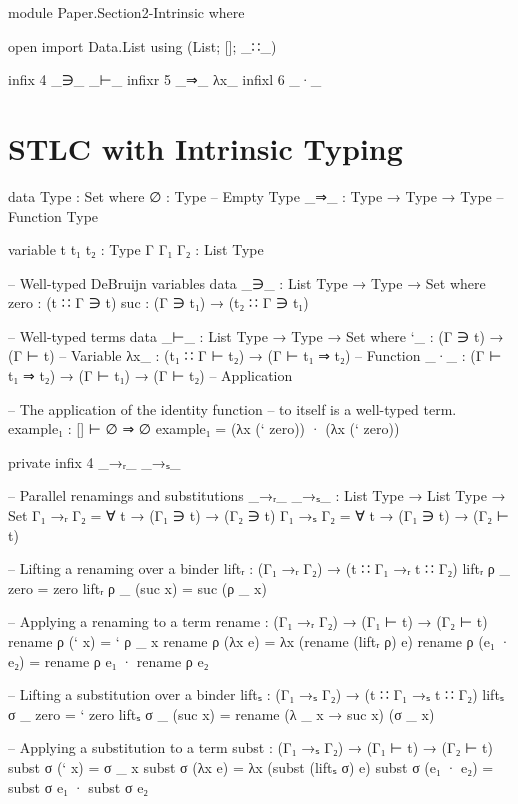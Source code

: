 \begin{code}[hide]
module Paper.Section2-Intrinsic where

open import Data.List using (List; []; _∷_)

infix  4  _∋_  _⊢_
infixr 5  _⇒_  λx_
infixl 6  _·_
\end{code}

\newpage
\section{STLC with Intrinsic Typing}

\begin{code}
data Type : Set where
  ∅    : Type                -- Empty Type
  _⇒_  : Type → Type → Type  -- Function Type

variable
  t t₁ t₂  : Type
  Γ Γ₁ Γ₂  : List Type

-- Well-typed DeBruijn variables
data _∋_ : List Type → Type → Set where
  zero  : (t ∷ Γ ∋ t)
  suc   : (Γ ∋ t₁) → (t₂ ∷ Γ ∋ t₁)

-- Well-typed terms
data _⊢_ : List Type → Type → Set where
  `_   : (Γ ∋ t) → (Γ ⊢ t)                    -- Variable
  λx_  : (t₁ ∷ Γ ⊢ t₂) → (Γ ⊢ t₁ ⇒ t₂)        -- Function
  _·_  : (Γ ⊢ t₁ ⇒ t₂) → (Γ ⊢ t₁) → (Γ ⊢ t₂)  -- Application
\end{code}
%
\begin{code}[hide]
-- The application of the identity function
-- to itself is a well-typed term.
example₁ : [] ⊢ ∅ ⇒ ∅
example₁ = (λx (` zero)) · (λx (` zero))

private
  infix  4  _→ᵣ_  _→ₛ_
\end{code}
%
\begin{code}
  -- Parallel renamings and substitutions
  _→ᵣ_ _→ₛ_ : List Type → List Type → Set
  Γ₁ →ᵣ Γ₂ = ∀ t → (Γ₁ ∋ t) → (Γ₂ ∋ t)
  Γ₁ →ₛ Γ₂ = ∀ t → (Γ₁ ∋ t) → (Γ₂ ⊢ t)

  -- Lifting a renaming over a binder
  liftᵣ : (Γ₁ →ᵣ Γ₂) → (t ∷ Γ₁ →ᵣ t ∷ Γ₂)
  liftᵣ ρ _ zero     = zero
  liftᵣ ρ _ (suc x)  = suc (ρ _ x)

  -- Applying a renaming to a term
  rename : (Γ₁ →ᵣ Γ₂) → (Γ₁ ⊢ t) → (Γ₂ ⊢ t)
  rename ρ (` x)      = ` ρ _ x
  rename ρ (λx e)     = λx (rename (liftᵣ ρ) e)
  rename ρ (e₁ · e₂)  = rename ρ e₁ · rename ρ e₂

  -- Lifting a substitution over a binder
  liftₛ : (Γ₁ →ₛ Γ₂) → (t ∷ Γ₁ →ₛ t ∷ Γ₂)
  liftₛ σ _ zero     = ` zero
  liftₛ σ _ (suc x)  = rename (λ _ x → suc x) (σ _ x)

  -- Applying a substitution to a term
  subst : (Γ₁ →ₛ Γ₂) → (Γ₁ ⊢ t) → (Γ₂ ⊢ t)
  subst σ (` x)      = σ _ x
  subst σ (λx e)     = λx (subst (liftₛ σ) e)
  subst σ (e₁ · e₂)  = subst σ e₁ · subst σ e₂
\end{code}
